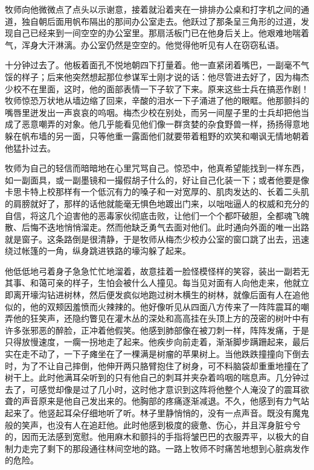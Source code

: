     牧师向他微微点了点头以示谢意，接着就沿着夹在一排排办公桌和打字机之间的通道，独自朝后面用帆布隔出的那间办公室走去。他跃过了那条呈三角形的过道，发现自己已经来到一间空空的办公室里。那扇活板门已在他身后关上。他艰难地喘着气，浑身大汗淋漓。办公室仍然是空空的。他觉得他听见有人在窃窃私语。

    十分钟过去了。他板着面孔不悦地朝四下打量着。他一直紧闭着嘴巴，一副毫不气馁的样子；后来他突然想起那位参谋军士刚才说的话：他尽管进去好了，因为梅杰少校不在里面，这时，他的面部表情一下子软了下来。原来这些士兵在搞恶作剧！牧师惊恐万状地从墙边缩了回来，辛酸的泪水一下子涌进了他的眼眶。他那颤抖的嘴唇里迸发出一声哀哀的呜咽。梅杰少校在别处，而另一间屋子里的士兵却把他当成了恶意嘲弄的对象。他几乎能看见他们像一群贪婪的杂食野兽一样，扬扬得意地躲在帆布墙的另一面，只等他重一露面他们就要带着粗野的欢笑和嘲讽无情地朝着他猛扑过去。

    牧师为自己的轻信而暗暗地在心里咒骂自己。惊恐中，他真希望能找到一样东西，如一副面具，或一副墨镜和一撮假胡子什么的，好让自己化装一下；或者他要是像卡思卡特上校那样有一个低沉有力的嗓子和一对宽厚的、肌肉发达的、长着二头肌的肩膀就好了，那样的话他就能毫无惧色地踱出门来，以咄咄逼人的权威和充分的自信，将这几个迫害他的恶毒家伙彻底击败，让他们一个个都吓破胆，全都魂飞魄散、后悔不迭地悄悄溜走。然而他缺乏勇气去面对他们。此时通向外面的唯一出路就是窗子。这条路倒是很清静，于是牧师从梅杰少校办公室的窗口跳了出去，迅速绕过帐篷的一角，纵身跳进铁路的壕沟躲了起来。

    他低低地弓着身子急急忙忙地溜着，故意挂着一脸怪模怪样的笑容，装出一副若无其事、和蔼可亲的样子，生怕会被什么人撞见。每当见对面有人向他走来，他就立即离开壕沟钻进树林，然后便发疯似地跑过树木横生的树林，就像后面有人在追他似的，他的双颊因羞愤而火辣辣的。他好像听见从四面八方传来了一阵阵震耳的嘲弄他的狂笑声，还隐约瞥见在灌木丛的深处和高高挂在头顶上方的茂密的树叶中有许多张邪恶的醉脸，正冲着他假笑。他感到肺部像在被刀刺一样，阵阵发痛，于是只得放慢速度，一瘸一拐地走了起来。他疾步向前走着，渐渐脚步蹒跚起来，最后实在走不动了，一下子瘫坐在了一棵满是树瘤的苹果树上。当他跌跌撞撞向下倒去时，为了不让自己摔倒，他伸开两只胳臂抱住了树身，可不料脑袋却重重地撞在了树干上。此时他满耳朵听到的只有他自己的刺耳并夹杂着呜咽的喘息声。几分钟过去了，可感觉却像是过了几小时，这时他才意识到这阵将他整个人淹没了的震耳欲聋的声音原来是他自己发出来的。他胸部的疼痛逐渐减退。不久，他感到有力气站起来了。他竖起耳朵仔细地听了听。林子里静悄悄的，没有一点声音。既没有魔鬼般的笑声，也没有人在追赶他。此时他感到极度的疲惫、伤心，并且浑身脏兮兮的，因而无法感到宽慰。他用麻木和颤抖的手指将皱巴巴的衣服弄平，以极大的自制力走完了剩下的那段通往林间空地的路。一路上牧师不时痛苦地想到心脏病发作的危险。


